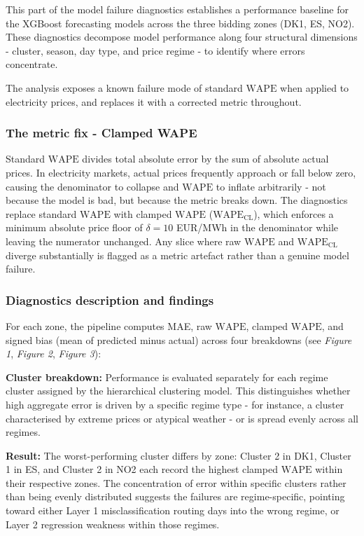 \documentclass[12pt, a4paper]{article}
\newcommand{\WAPE}{\text{WAPE}}
\newcommand{\WAPECL}{\text{WAPE}_{\text{CL}}}
\begin{document}
This part of the model failure diagnostics establishes a performance baseline for
the XGBoost forecasting models across the three bidding zones (DK1, ES, NO2).
These diagnostics decompose model performance along four structural dimensions -
cluster, season, day type, and price regime - to identify where errors
concentrate.

The analysis exposes a known failure mode of standard $\WAPE$ when applied to
electricity prices, and replaces it with a corrected metric throughout.

\subsubsection{The metric fix - Clamped WAPE}

Standard $\WAPE$ divides total absolute error by the sum of absolute actual
prices. In electricity markets, actual prices frequently approach or fall below
zero, causing the denominator to collapse and $\WAPE$ to inflate arbitrarily -
not because the model is bad, but because the metric breaks down. The diagnostics
replace standard $\WAPE$ with clamped $\WAPE$ ($\WAPECL$), which enforces a
minimum absolute price floor of $\delta = 10$ EUR/MWh in the denominator while
leaving the numerator unchanged. Any slice where raw $\WAPE$ and $\WAPECL$
diverge substantially is flagged as a metric artefact rather than a genuine model
failure.

\subsubsection{Diagnostics description and findings}

For each zone, the pipeline computes MAE, raw $\WAPE$, clamped $\WAPE$, and
signed bias (mean of predicted minus actual) across four breakdowns (see \emph{Figure 1}, \emph{Figure 2}, \emph{Figure 3}):

\textbf{Cluster breakdown: } Performance is evaluated separately for each regime cluster
assigned by the hierarchical clustering model. This distinguishes whether high
aggregate error is driven by a specific regime type - for instance, a cluster
characterised by extreme prices or atypical weather - or is spread evenly across
all regimes.


\textbf{Result: }The worst-performing cluster differs by zone: Cluster 2 in DK1,
Cluster 1 in ES, and Cluster 2 in NO2 each record the highest clamped $\WAPE$
within their respective zones. The concentration of error within specific clusters
rather than being evenly distributed suggests the failures are regime-specific,
pointing toward either Layer 1 misclassification routing days into the wrong
regime, or Layer 2 regression weakness within those regimes.
\end{document}

